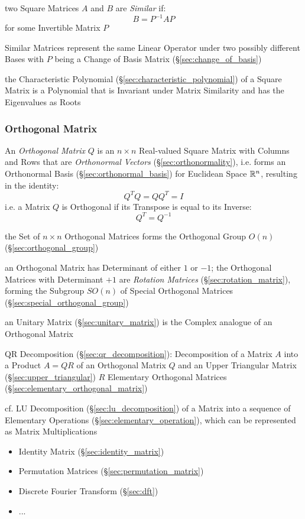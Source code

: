 two Square Matrices $A$ and $B$ are \emph{Similar} if:
\[
  B = P^{-1}AP
\]
for some Invertible Matrix $P$

Similar Matrices represent the same Linear Operator under two possibly
different Bases with $P$ being a Change of Basis Matrix
(\S\ref{sec:change_of_basis})

the Characteristic Polynomial (\S\ref{sec:characteristic_polynomial}) of a
Square Matrix is a Polynomial that is Invariant under Matrix Similarity and has
the Eigenvalues as Roots



\subsubsection{Orthogonal Matrix}\label{sec:orthogonal_matrix}

An \emph{Orthogonal Matrix} $Q$ is an $n \times n $ Real-valued Square Matrix
with Columns and Rows that are \emph{Orthonormal Vectors}
(\S\ref{sec:orthonormality}), i.e. forms an Orthonormal Basis
(\S\ref{sec:orthonormal_basis}) for Euclidean Space $\mathbb{R}^n$, resulting in
the identity:
\[
  Q^TQ = QQ^T = I
\]
i.e. a Matrix $Q$ is Orthogonal if its Transpose is equal to its Inverse:
\[
  Q^T = Q^{-1}
\]

the Set of $n \times n$ Orthogonal Matrices forms the Orthogonal Group
$O(n)$ (\S\ref{sec:orthogonal_group})

an Orthogonal Matrix has Determinant of either $1$ or $-1$; the Orthogonal
Matrices with Determinant $+1$ are \emph{Rotation Matrices}
(\S\ref{sec:rotation_matrix}), forming the Subgroup $SO(n)$ of Special
Orthogonal Matrices (\S\ref{sec:special_orthogonal_group})

\fist an Unitary Matrix (\S\ref{sec:unitary_matrix}) is the Complex analogue of
an Orthogonal Matrix

QR Decomposition (\S\ref{sec:qr_decomposition}): Decomposition of a Matrix $A$
into a Product $A = QR$ of an Orthogonal Matrix $Q$ and an Upper Triangular
Matrix (\S\ref{sec:upper_triangular}) $R$ \fist Elementary Orthogonal Matrices
(\S\ref{sec:elementary_orthogonal_matrix})

cf. LU Decomposition (\S\ref{sec:lu_decomposition}) of a Matrix into a sequence
of Elementary Operations (\S\ref{sec:elementary_operation}), which can be
represented as Matrix Multiplications

\begin{itemize}
  \item Identity Matrix (\S\ref{sec:identity_matrix})
  \item Permutation Matrices (\S\ref{sec:permutation_matrix})
  \item Discrete Fourier Transform (\S\ref{sec:dft})
  \item ...
\end{itemize}



